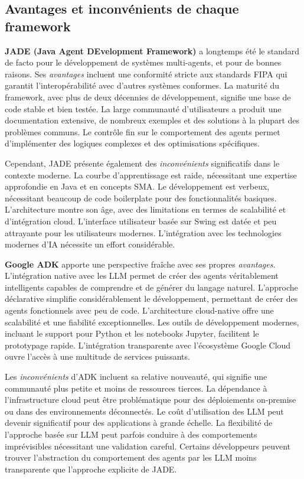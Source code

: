 \subsection{Avantages et inconvénients de chaque framework}

\textbf{JADE (Java Agent DEvelopment Framework)} a longtemps été le standard de facto pour le développement de systèmes multi-agents, et pour de bonnes raisons. Ses \emph{avantages} incluent une conformité stricte aux standards FIPA qui garantit l'interopérabilité avec d'autres systèmes conformes. La maturité du framework, avec plus de deux décennies de développement, signifie une base de code stable et bien testée. La large communauté d'utilisateurs a produit une documentation extensive, de nombreux exemples et des solutions à la plupart des problèmes communs. Le contrôle fin sur le comportement des agents permet d'implémenter des logiques complexes et des optimisations spécifiques.

Cependant, JADE présente également des \emph{inconvénients} significatifs dans le contexte moderne. La courbe d'apprentissage est raide, nécessitant une expertise approfondie en Java et en concepts SMA. Le développement est verbeux, nécessitant beaucoup de code boilerplate pour des fonctionnalités basiques. L'architecture montre son âge, avec des limitations en termes de scalabilité et d'intégration cloud. L'interface utilisateur basée sur Swing est datée et peu attrayante pour les utilisateurs modernes. L'intégration avec les technologies modernes d'IA nécessite un effort considérable.

\textbf{Google ADK} apporte une perspective fraîche avec ses propres \emph{avantages}. L'intégration native avec les LLM permet de créer des agents véritablement intelligents capables de comprendre et de générer du langage naturel. L'approche déclarative simplifie considérablement le développement, permettant de créer des agents fonctionnels avec peu de code. L'architecture cloud-native offre une scalabilité et une fiabilité exceptionnelles. Les outils de développement modernes, incluant le support pour Python et les notebooks Jupyter, facilitent le prototypage rapide. L'intégration transparente avec l'écosystème Google Cloud ouvre l'accès à une multitude de services puissants.

Les \emph{inconvénients} d'ADK incluent sa relative nouveauté, qui signifie une communauté plus petite et moins de ressources tierces. La dépendance à l'infrastructure cloud peut être problématique pour des déploiements on-premise ou dans des environnements déconnectés. Le coût d'utilisation des LLM peut devenir significatif pour des applications à grande échelle. La flexibilité de l'approche basée sur LLM peut parfois conduire à des comportements imprévisibles nécessitant une validation careful. Certains développeurs peuvent trouver l'abstraction du comportement des agents par les LLM moins transparente que l'approche explicite de JADE.

